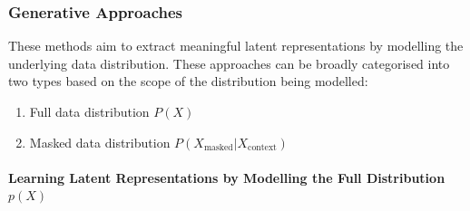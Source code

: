 \subsubsection{Generative Approaches}

These methods aim to extract meaningful latent representations by modelling the underlying data distribution. These approaches can be broadly categorised into two types based on the scope of the distribution being modelled:
\begin{enumerate}
    \item Full data distribution $P(X)$
    \item Masked data distribution $P(X_{\text{masked}}|X_{\text{context}})$
\end{enumerate}

\paragraph{Learning Latent Representations by Modelling the Full Distribution $p(X)$}

